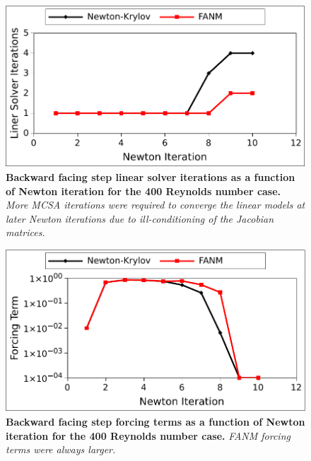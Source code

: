 \begin{figure}[t!]
  \begin{center}
    \includegraphics[width=6in]{chapters/nonlinear_problem/step_re400_iters.pdf}
  \end{center}
  \caption{\textbf{Backward facing step linear solver iterations as a
      function of Newton iteration for the 400 Reynolds number case.}
    \textit{More MCSA iterations were required to converge the linear
      models at later Newton iterations due to ill-conditioning of the
      Jacobian matrices.}}
  \label{fig:step_re400_iters}
\end{figure}

\begin{figure}[t!]
  \begin{center}
    \includegraphics[width=6in]{chapters/nonlinear_problem/step_re400_forcing.pdf}
  \end{center}
  \caption{\textbf{Backward facing step forcing terms as a function of
      Newton iteration for the 400 Reynolds number case.} \textit{FANM
      forcing terms were always larger.}}
  \label{fig:step_re400_forcing}
\end{figure}

